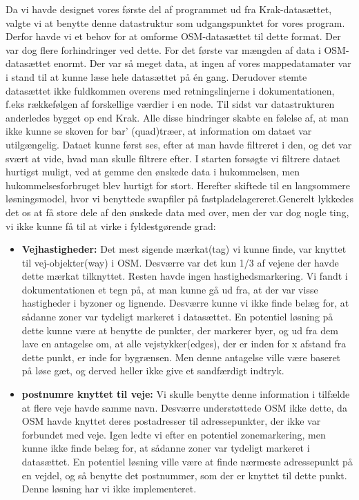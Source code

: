 Da vi havde designet vores første del af programmet ud fra Krak-datasættet, valgte vi at benytte denne datastruktur som udgangspunktet for vores program. Derfor havde vi et behov for at omforme OSM-datasættet til dette format. Der var dog flere forhindringer ved dette. For det første var mængden af data i OSM-datasættet enormt. Der var så meget data, at ingen af vores mappedatamater var i stand til at kunne læse hele datasættet på én gang. Derudover stemte datasættet ikke fuldkommen overens med retningslinjerne i dokumentationen, f.eks rækkefølgen af forskellige værdier i en node. Til sidst var datastrukturen anderledes bygget op end Krak. Alle disse hindringer skabte en følelse af, at man ikke kunne se skoven for bar' (quad)træer, at information om dataet var utilgængelig. Dataet kunne først ses, efter at man havde filtreret i den, og det var svært at vide, hvad man skulle filtrere efter. I starten forsøgte vi filtrere dataet hurtigst muligt, ved at gemme den ønskede data i hukommelsen, men hukommelsesforbruget blev hurtigt for stort. Herefter skiftede til en langsommere løsningsmodel, hvor vi benyttede swapfiler på fastpladelagereret.Generelt lykkedes det os at få store dele af den ønskede data med over, men der var dog nogle ting, vi ikke kunne få til at virke i fyldestgørende grad:

\begin{itemize}
	\item \textbf{Vejhastigheder:} Det mest sigende mærkat(tag) vi kunne finde, var knyttet til vej-objekter(way) i OSM. Desværre var det kun 1/3 af vejene der havde dette mærkat tilknyttet. Resten havde ingen hastighedsmarkering. Vi fandt i dokumentationen et tegn på, at man kunne gå ud fra, at der var visse hastigheder i byzoner og lignende. Desværre kunne vi ikke finde belæg for, at sådanne zoner var tydeligt markeret i datasættet. En potentiel løsning på dette kunne være at benytte de punkter, der markerer byer, og ud fra dem lave en antagelse om, at alle vejstykker(edges), der er inden for x afstand fra dette punkt, er inde for bygrænsen. Men denne antagelse ville være baseret på løse gæt, og derved heller ikke give et sandfærdigt indtryk.
	\item \textbf{postnumre knyttet til veje:} Vi skulle benytte denne information i tilfælde at flere veje havde samme navn. Desværre understøttede OSM ikke dette, da OSM havde knyttet deres postadresser til adressepunkter, der ikke var forbundet med veje. Igen ledte vi efter en potentiel zonemarkering, men kunne ikke finde belæg for, at sådanne zoner var tydeligt markeret i datasættet. En potentiel løsning ville være at finde nærmeste adressepunkt på en vejdel, og så benytte det postnummer, som der er knyttet til dette punkt. Denne løsning har vi ikke implementeret.
\end{itemize}

